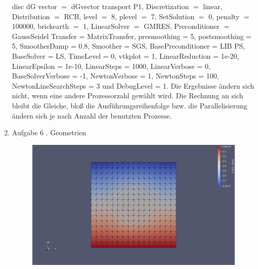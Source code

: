 \documentclass[12pt,a4paper]{scrartcl}
\numberwithin{equation}{section}
\begin{document}
\begin{enumerate}[label=(\roman*)]
  disc dG vector $=$
dGvector transport P1, Discretization $=$ linear,
  Distribution $=$ RCB, level $=$ 8, plevel $=$ 7, SetSolution $=$ 0, penalty $=$ 100000, brickearth $=$ 1, LinearSolver $=$ GMRES, Preconditioner $=$ GaussSeidel
Transfer = MatrixTransfer, 
presmoothing = 5, 
postsmoothing = 5, 
SmootherDamp = 0.8, 
Smoother = SGS, 
BasePreconditioner = LIB PS, 
BaseSolver = LS, 
TimeLevel = 0, 
vtkplot = 1, 
LinearReduction = 1e-20, 
LinearEpsilon = 1e-10, 
LinearSteps = 1000, 
LinearVerbose = 0, 
BaseSolverVerbose = -1, 
NewtonVerbose = 1, 
NewtonSteps = 100, 
NewtonLineSearchSteps = 3 und 
DebugLevel = 1.
\newline 
Die Ergebnisse ändern sich nicht, wenn eine andere Prozessorzahl gewählt wird. Die Rechnung an sich bleibt die Gleiche, bloß die Ausführungsreihenfolge bzw. die Parallelisierung ändern sich je nach Anzahl der benutzten Prozesse. 

\item Aufgabe 6
. Geometrien
\newline

\begin{figure}[H]
	\centering
		\includegraphics[width=\textwidth]{../Aufgabe6/Problem_Discontinuous/Mesh_UnitSquare8Triangles/level_3/geometrie.png} 
\end{figure}


\end{enumerate}
\end{document}
